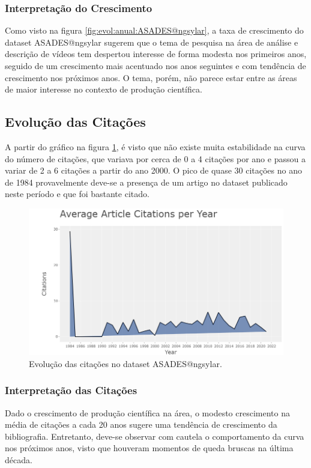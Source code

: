 \subsubsection{Interpretação do Crescimento} 

Como visto na figura \ref{fig:evol:anual:ASADES@ngsylar}, a taxa de crescimento do dataset ASADES@ngsylar sugerem que o tema de pesquisa na área de análise e descrição de vídeos tem despertou interesse de forma modesta nos primeiros anos, seguido de um crescimento mais acentuado nos anos seguintes e com tendência de crescimento nos próximos anos. O tema, porém, não parece estar entre as áreas de maior interesse no contexto de produção científica.

\subsection{Evolução das Citações}

A partir do gráfico na figura \ref{fig:evol:anual:citacoes:ASADES@ngsylar}, é visto que não existe muita estabilidade na curva do número de citações, que variava por cerca de 0 a 4 citações por ano e passou a variar de 2 a 6 citações a partir do ano 2000. O pico de quase 30 citações no ano de 1984 provavelmente deve-se a presença de um artigo no dataset publicado neste período e que foi bastante citado.

\begin{figure}[H]
    \centering
    \includegraphics[width=1\textwidth]{experiments/ngsylar/PesqBibliogr/Imagens/ASADES-CitationsYear.png}
    \caption{Evolução das citações no dataset ASADES@ngsylar.}
    \label{fig:evol:anual:citacoes:ASADES@ngsylar}
\end{figure}

\subsubsection{Interpretação das Citações}
Dado o crescimento de produção científica na área, o modesto crescimento na média de citações a cada 20 anos sugere uma tendência de crescimento da bibliografia. Entretanto, deve-se observar com cautela o comportamento da curva nos próximos anos, visto que houveram momentos de queda bruscas na última década.


